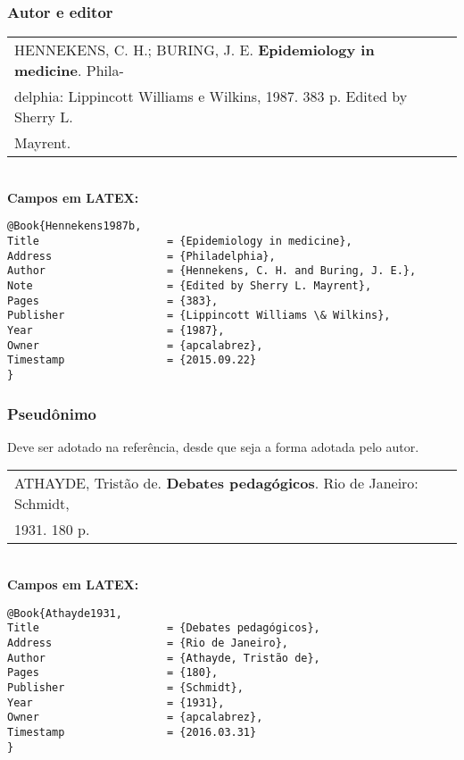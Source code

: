 \subsubsection{Autor e editor}

\begin{tabular}{|l|c|} \hline
HENNEKENS, C. H.; BURING, J. E. \textbf{Epidemiology in medicine}. Phila-\\delphia:  Lippincott Williams e Wilkins, 1987. 383 p. Edited by Sherry L. \\Mayrent. \\\hline
\end{tabular}\\

\textbf{Campos em LATEX:}

\begin{verbatim}
@Book{Hennekens1987b,
Title                    = {Epidemiology in medicine},
Address                  = {Philadelphia},
Author                   = {Hennekens, C. H. and Buring, J. E.},
Note                     = {Edited by Sherry L. Mayrent},
Pages                    = {383},
Publisher                = {Lippincott Williams \& Wilkins},
Year                     = {1987},
Owner                    = {apcalabrez},
Timestamp                = {2015.09.22}
}
\end{verbatim}
\subsubsection{Pseudônimo}

Deve ser adotado na referência, desde que seja a forma adotada pelo autor. \\

\begin{tabular}{|l|c|} \hline
ATHAYDE, Tristão de. \textbf{Debates pedagógicos}. Rio de Janeiro: Schmidt, \\ 1931. 180 p.   \\\hline
\end{tabular}\\

\textbf{Campos em LATEX:}

\begin{verbatim}
@Book{Athayde1931,
Title                    = {Debates pedagógicos},
Address                  = {Rio de Janeiro},
Author                   = {Athayde, Tristão de},
Pages                    = {180},
Publisher                = {Schmidt},
Year                     = {1931},
Owner                    = {apcalabrez},
Timestamp                = {2016.03.31}
}
\end{verbatim}

